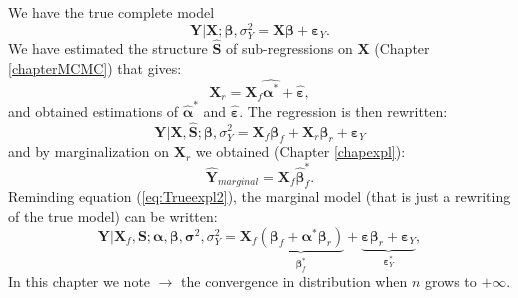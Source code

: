 \documentclass[12pt,a4paper]{report}
\begin{document}
	
	We have the true complete model
	\begin{equation}
		\boldsymbol{Y}|\boldsymbol{X};\boldsymbol{\beta},\sigma_Y^2= \boldsymbol{X}\boldsymbol{\beta}+\boldsymbol{\varepsilon}_Y.
\end{equation}		
	We have estimated the structure $\hat{\boldsymbol{S}} $ of sub-regressions on $\boldsymbol{X}$ (Chapter \ref{chapterMCMC}) that gives:
	\begin{equation}
		\boldsymbol{X}_r 
		=\boldsymbol{X}_f\hat{\boldsymbol{\alpha}^*}+\hat{\boldsymbol{\varepsilon}},
	\end{equation}
	and obtained estimations of $\hat{\boldsymbol{\alpha}}^*$ and $\hat{\boldsymbol{\varepsilon}}$. 
	The regression is then rewritten:
		\begin{equation}
		\boldsymbol{Y}|\boldsymbol{X},\hat{\boldsymbol{S}};\boldsymbol{\beta},\sigma_Y^2= \boldsymbol{X}_f\boldsymbol{\beta}_f+\boldsymbol{X}_r\boldsymbol{\beta}_r+\boldsymbol{\varepsilon}_Y
\end{equation}	
	and by marginalization on $\boldsymbol{X}_r$ we obtained (Chapter \ref{chapexpl}):
	\begin{equation}
	\hat{\boldsymbol{Y}}_{marginal}=\boldsymbol{X}_f\hat{\boldsymbol{\beta}}_f^*.%
	\end{equation}
		Reminding equation (\ref{eq:Trueexpl2}), the marginal model (that is just a rewriting of the true model) can be written:
		\begin{equation}
		\boldsymbol{Y}|\boldsymbol{X}_f,\boldsymbol{S};\boldsymbol{\alpha},\boldsymbol{\beta},\boldsymbol{\sigma}^2,\sigma_Y^2= \boldsymbol{X}_f\underbrace{(\boldsymbol{\beta}_f+\boldsymbol{\alpha}^*\boldsymbol{\beta}_r)}_{\boldsymbol{\beta}^*_f}+\underbrace{\boldsymbol{\varepsilon}\boldsymbol{\beta}_r+\boldsymbol{\varepsilon}_Y}_{\boldsymbol{\varepsilon}_Y^*}, \label{pluginorig}
		\end{equation}
In this chapter we note $\longrightarrow$ the convergence in distribution when $n$ grows to $+\infty$.
\end{document}
